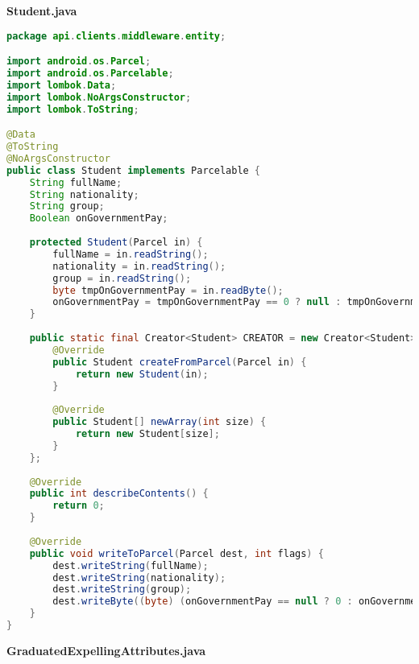 \textbf{Student.java}
\begin{lstlisting}[language=Java]
package api.clients.middleware.entity;

import android.os.Parcel;
import android.os.Parcelable;
import lombok.Data;
import lombok.NoArgsConstructor;
import lombok.ToString;

@Data
@ToString
@NoArgsConstructor
public class Student implements Parcelable {
	String fullName;
	String nationality;
	String group;
	Boolean onGovernmentPay;
	
	protected Student(Parcel in) {
		fullName = in.readString();
		nationality = in.readString();
		group = in.readString();
		byte tmpOnGovernmentPay = in.readByte();
		onGovernmentPay = tmpOnGovernmentPay == 0 ? null : tmpOnGovernmentPay == 1;
	}
	
	public static final Creator<Student> CREATOR = new Creator<Student>() {
		@Override
		public Student createFromParcel(Parcel in) {
			return new Student(in);
		}
		
		@Override
		public Student[] newArray(int size) {
			return new Student[size];
		}
	};
	
	@Override
	public int describeContents() {
		return 0;
	}
	
	@Override
	public void writeToParcel(Parcel dest, int flags) {
		dest.writeString(fullName);
		dest.writeString(nationality);
		dest.writeString(group);
		dest.writeByte((byte) (onGovernmentPay == null ? 0 : onGovernmentPay ? 1 : 2));
	}
}

\end{lstlisting}
\textbf{GraduatedExpellingAttributes.java}
